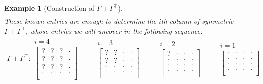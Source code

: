 \documentclass[a4paper,12pt]{article}
\newtheorem{example}{Example}
\theoremstyle{definition}
\begin{document}
\begin{example}[Construction of $\Gamma + \Gamma^\top$]
\begin{align*}
\end{align*}
These known entries are enough to determine the $i$th column of symmetric $\Gamma + \Gamma^\top$, whose entries we will uncover in the following sequence:
\begin{align*}
    \Gamma + \Gamma^\top:
\begin{array}{c} i = 4 \\
    \begin{bmatrix}
    ? & ? & ? & \cdot \\
    ? & ? & ? & \cdot \\
    ? & ? & ? & \cdot \\
    \cdot & \cdot & \cdot & \cdot \\
\end{bmatrix} \end{array} \qquad
\begin{array}{c} i = 3  \\
\begin{bmatrix}
    ? & ? & \cdot & \cdot \\
    ? & ? & \cdot & \cdot \\
    \cdot & \cdot & \cdot & \cdot \\
    \cdot & \cdot & \cdot & \cdot \\
\end{bmatrix} \end{array} \qquad
\begin{array}{c} i = 2 \\
\begin{bmatrix}
    ? & \cdot & \cdot & \cdot \\
    \cdot & \cdot & \cdot & \cdot \\
    \cdot & \cdot & \cdot & \cdot \\
    \cdot & \cdot & \cdot & \cdot \\
\end{bmatrix} \end{array} \qquad
\begin{array}{c} i = 1 \\
\begin{bmatrix}
    \cdot & \cdot & \cdot & \cdot \\
    \cdot & \cdot & \cdot & \cdot \\
    \cdot & \cdot & \cdot & \cdot \\
    \cdot & \cdot & \cdot & \cdot \\
\end{bmatrix} \end{array} \qquad
\end{align*}
\end{example}
\end{document}
